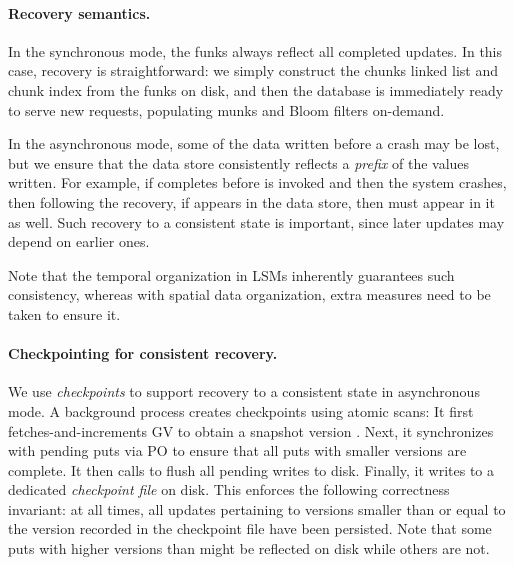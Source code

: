 \paragraph{Recovery semantics.}
In the synchronous mode, 
the funks always reflect all completed updates. In this case, recovery is straightforward: we simply construct
the chunks linked list and chunk index from the funks on disk, and then the database is immediately ready to serve new requests, populating munks and Bloom filters on-demand.  

In the asynchronous mode, some of the  data written before a crash may be lost, but we  
ensure that the data store consistently reflects a \emph{prefix} of the  values written.
For example, if  completes before  
is invoked and then the system crashes, then following the recovery, 
if  appears in the data store, then  must appear in it as well. 
Such recovery to a consistent state is important, since later updates may depend on earlier ones. 

Note that the temporal organization in LSMs inherently guarantees such consistency, whereas with spatial data organization,
extra measures need to be taken to ensure it.

\paragraph{Checkpointing for consistent recovery.}

We use \emph{checkpoints} to support recovery to a consistent state in asynchronous mode.
A background process creates checkpoints using atomic scans: 
It first fetches-and-increments GV to obtain a snapshot version .  Next, 
it synchronizes with pending puts via PO to ensure that all puts with smaller versions are complete. 
It then calls  to flush all pending writes to disk.
Finally, it writes  to a dedicated \emph{checkpoint file} on disk.
This enforces the following correctness invariant: at all times, all updates pertaining to versions smaller 
than or equal to the version recorded in the checkpoint file have been persisted.
Note that some puts with higher versions than  might be reflected on disk while others are not. 


